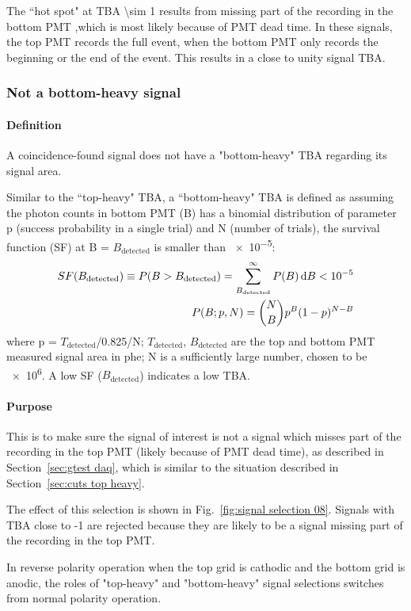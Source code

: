 The ``hot spot" at TBA \num{\sim 1} results from missing part of the recording in the bottom PMT ,which is most likely because of PMT dead time. In these signals, the top PMT records the full event, when the bottom PMT only records the beginning or the end of the event. This results in a close to unity signal TBA.

\subsubsection{Not a bottom-heavy signal}
\paragraph{Definition}
A coincidence-found signal does not have a "bottom-heavy" TBA regarding its signal area. 

Similar to the ``top-heavy" TBA, a ``bottom-heavy" TBA is defined as assuming the photon counts in bottom PMT (B) has a binomial distribution of parameter p (success probability in a single trial) and N (number of trials), the survival function (SF) at B = $B_{\text{detected}}$ is smaller than \num{e-5}:
\begin{align}
SF (B_{\text{detected}}) \equiv P(B > B_{\text{detected}}) = \sum_{B_{\text{detected}}}^{\infty} P (B) \operatorname{d}\!{B}< \num{e-5} \\
P (B; p, N) = \binom{N}{B} p^{B} (1-p)^{N-B}
\end{align}    
where p = $T_{\text{detected}}$/\num{0.825}/N; $T_{\text{detected}}$, $B_{\text{detected}}$ are the top and bottom PMT measured signal area in \si{phe}; N is a sufficiently large number, chosen to be \num{e6}. A low SF ($B_{\text{detected}}$) indicates a low TBA. 
\paragraph{Purpose}
This is to make sure the signal of interest is not a signal which misses part of the recording in the top PMT (likely because of PMT dead time), as described in Section~\ref{sec:gtest daq}, which is similar to the situation described in Section~\ref{sec:cuts top heavy}.

The effect of this selection is shown in Fig.~\ref{fig:signal selection 08}. Signals with TBA close to -1 are rejected because they are likely to be a signal missing part of the recording in the top PMT.

In reverse polarity operation when the top grid is cathodic and the bottom grid is anodic, the roles of "top-heavy" and "bottom-heavy" signal selections switches from normal polarity operation.

